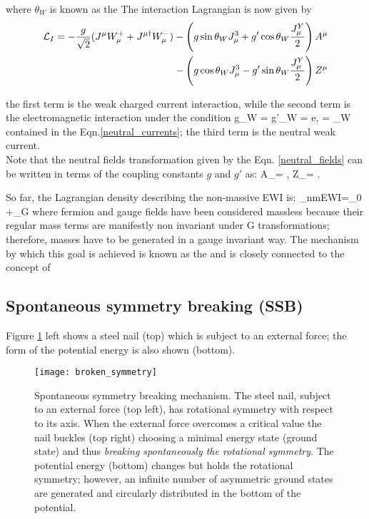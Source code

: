 \noindent where $\theta_W$ is known as the  The interaction Lagrangian is now given by
\begin{align}
\mathcal{L}_I =-\frac{g}{\sqrt{2}}(J^\mu W_\mu^+ + J^{\mu\dagger}W_\mu^-) -\left(g\sin\theta_W J_\mu^3 + g'\cos\theta_W \frac{J_\mu^Y}{2} \right)A^\mu \\ \nonumber
- \left(g\cos\theta_W J_\mu^3 - g'\sin\theta_W \frac{J_\mu^Y}{2} \right)Z^\mu 
\end{align}

\noindent the first term is the weak charged current interaction, while the second term is the electromagnetic interaction under the condition
\beqn
g\sin\theta_W = g'\cos\theta_W = e, \quad {}= \tan\theta_W  
\eeqn
\noindent contained in the Eqn.\ref{neutral_currents}; the third term is the neutral weak current.\\

Note that the neutral fields transformation given by the Eqn. \ref{neutral_fields} can be written in terms of the coupling constants $g$ and $g'$ as:
\beqn\label{neutral_bosons}
A_\mu= , \qquad  Z_\mu= .
\eeqn

So far, the Lagrangian density describing the non-massive EWI is:
\beqn\label{nmewi_lagr}
\Lagr_{nmEWI}=\Lagr_0 +\Lagr_G
\eeqn
\noindent where fermion and gauge fields have been considered massless because their regular mass terms are manifestly non invariant under G transformations; therefore, masses have to be generated in a gauge invariant way. The mechanism by which this goal is achieved is known as the  and is closely connected to the concept of 

\subsection{Spontaneous symmetry breaking (SSB)}

Figure \ref{ssb} left shows a steel nail (top) which is subject to an external force; the form of the potential energy is also shown (bottom).

\begin{figure}[!h]
\centering
\texttt{[image: broken\_symmetry]}
\caption[Spontaneous symmetry breaking mechanism]{Spontaneous symmetry breaking mechanism. The steel nail, subject to an external force (top left), has rotational symmetry with respect to its axis. When the external force overcomes a critical value the nail buckles (top right) choosing a minimal energy state (ground state) and thus \textit{breaking spontaneously the rotational symmetry}. The potential energy (bottom) changes but holds the rotational symmetry; however, an infinite number of asymmetric ground states are generated and circularly distributed in the bottom of the potential\cite{broken_symmetry}.}
\label{ssb}
\end{figure}

